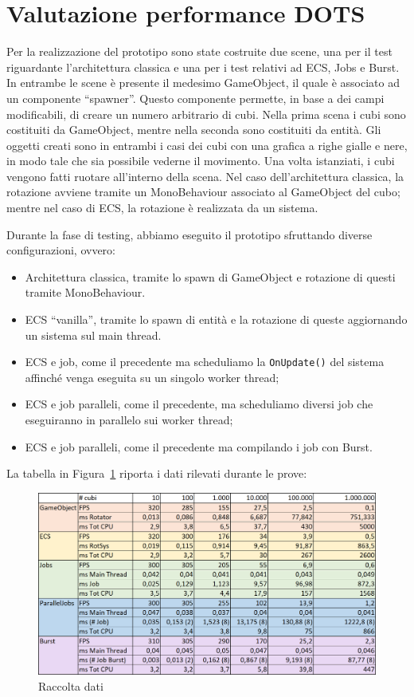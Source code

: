 \section{Valutazione performance DOTS}

Per la realizzazione del prototipo sono state costruite due scene, una per il test riguardante l'architettura classica e una per i test relativi ad ECS, Jobs e Burst. In entrambe le scene è presente il medesimo GameObject, il quale è associato ad un componente ``spawner''. Questo componente permette, in base a dei campi modificabili, di creare un numero arbitrario di cubi. Nella prima scena i cubi sono costituiti da GameObject, mentre nella seconda sono costituiti da entità. Gli oggetti creati sono in entrambi i casi dei cubi con una grafica a righe gialle e nere, in modo tale che sia possibile vederne il movimento. Una volta istanziati, i cubi vengono fatti ruotare all'interno della scena. Nel caso dell'architettura classica, la rotazione avviene tramite un MonoBehaviour associato al GameObject del cubo; mentre nel caso di ECS, la rotazione è realizzata da un sistema.

Durante la fase di testing, abbiamo eseguito il prototipo sfruttando diverse configurazioni, ovvero:

\begin{itemize}
    \item Architettura classica, tramite lo spawn di GameObject e rotazione di questi tramite MonoBehaviour.
    \item ECS ``vanilla'', tramite lo spawn di entità e la rotazione di queste aggiornando un sistema sul main thread.
    \item ECS e job, come il precedente ma scheduliamo la \verb|OnUpdate()| del sistema affinché venga eseguita su un singolo worker thread;
    \item ECS e job paralleli, come il precedente, ma scheduliamo diversi job che eseguiranno in parallelo sui worker thread;
    \item ECS e job paralleli, come il precedente ma compilando i job con Burst.
\end{itemize}

La tabella in Figura~\ref{fig:dati-stress-test} riporta i dati rilevati durante le prove:

\begin{figure}[!ht]
    \centering
    \includegraphics[width=0.95\columnwidth]{gfx/imgs/chapter5/RaccoltaDati.png}
    \caption{Raccolta dati}
    \label{fig:dati-stress-test}
\end{figure}

